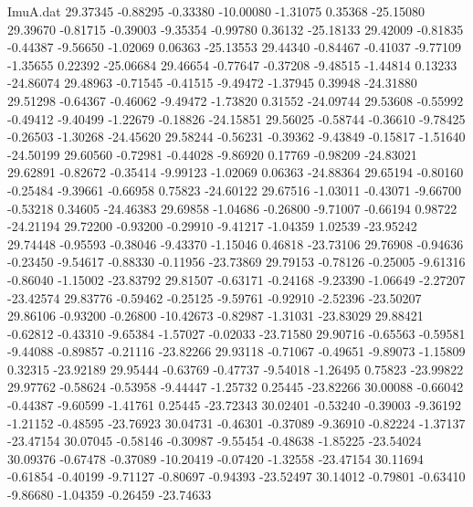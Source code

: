 \begin{filecontents}{ImuA.dat}
  29.37345   -0.88295   -0.33380  -10.00080   -1.31075    0.35368  -25.15080
  29.39670   -0.81715   -0.39003   -9.35354   -0.99780    0.36132  -25.18133
  29.42009   -0.81835   -0.44387   -9.56650   -1.02069    0.06363  -25.13553
  29.44340   -0.84467   -0.41037   -9.77109   -1.35655    0.22392  -25.06684
  29.46654   -0.77647   -0.37208   -9.48515   -1.44814    0.13233  -24.86074
  29.48963   -0.71545   -0.41515   -9.49472   -1.37945    0.39948  -24.31880
  29.51298   -0.64367   -0.46062   -9.49472   -1.73820    0.31552  -24.09744
  29.53608   -0.55992   -0.49412   -9.40499   -1.22679   -0.18826  -24.15851
  29.56025   -0.58744   -0.36610   -9.78425   -0.26503   -1.30268  -24.45620
  29.58244   -0.56231   -0.39362   -9.43849   -0.15817   -1.51640  -24.50199
  29.60560   -0.72981   -0.44028   -9.86920    0.17769   -0.98209  -24.83021
  29.62891   -0.82672   -0.35414   -9.99123   -1.02069    0.06363  -24.88364
  29.65194   -0.80160   -0.25484   -9.39661   -0.66958    0.75823  -24.60122
  29.67516   -1.03011   -0.43071   -9.66700   -0.53218    0.34605  -24.46383
  29.69858   -1.04686   -0.26800   -9.71007   -0.66194    0.98722  -24.21194
  29.72200   -0.93200   -0.29910   -9.41217   -1.04359    1.02539  -23.95242
  29.74448   -0.95593   -0.38046   -9.43370   -1.15046    0.46818  -23.73106
  29.76908   -0.94636   -0.23450   -9.54617   -0.88330   -0.11956  -23.73869
  29.79153   -0.78126   -0.25005   -9.61316   -0.86040   -1.15002  -23.83792
  29.81507   -0.63171   -0.24168   -9.23390   -1.06649   -2.27207  -23.42574
  29.83776   -0.59462   -0.25125   -9.59761   -0.92910   -2.52396  -23.50207
  29.86106   -0.93200   -0.26800  -10.42673   -0.82987   -1.31031  -23.83029
  29.88421   -0.62812   -0.43310   -9.65384   -1.57027   -0.02033  -23.71580
  29.90716   -0.65563   -0.59581   -9.44088   -0.89857   -0.21116  -23.82266
  29.93118   -0.71067   -0.49651   -9.89073   -1.15809    0.32315  -23.92189
  29.95444   -0.63769   -0.47737   -9.54018   -1.26495    0.75823  -23.99822
  29.97762   -0.58624   -0.53958   -9.44447   -1.25732    0.25445  -23.82266
  30.00088   -0.66042   -0.44387   -9.60599   -1.41761    0.25445  -23.72343
  30.02401   -0.53240   -0.39003   -9.36192   -1.21152   -0.48595  -23.76923
  30.04731   -0.46301   -0.37089   -9.36910   -0.82224   -1.37137  -23.47154
  30.07045   -0.58146   -0.30987   -9.55454   -0.48638   -1.85225  -23.54024
  30.09376   -0.67478   -0.37089  -10.20419   -0.07420   -1.32558  -23.47154
  30.11694   -0.61854   -0.40199   -9.71127   -0.80697   -0.94393  -23.52497
  30.14012   -0.79801   -0.63410   -9.86680   -1.04359   -0.26459  -23.74633

\end{filecontents}
